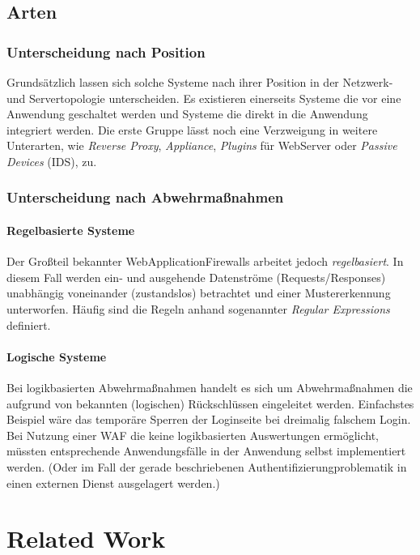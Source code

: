 \subsection{Arten}

\subsubsection{Unterscheidung nach Position}
Grundsätzlich lassen sich solche Systeme nach ihrer Position in der Netzwerk- und Servertopologie unterscheiden. Es existieren einerseits Systeme die vor eine Anwendung geschaltet werden und Systeme die direkt in die Anwendung integriert werden. Die erste Gruppe lässt noch eine Verzweigung in weitere Unterarten, wie \emph{Reverse Proxy}, \emph{Appliance}, \emph{Plugins} für WebServer oder \emph{Passive Devices} (IDS), zu.


\subsubsection{Unterscheidung nach Abwehrmaßnahmen}

\paragraph{Regelbasierte Systeme}
Der Großteil bekannter WebApplicationFirewalls arbeitet jedoch \emph{regelbasiert}. In diesem Fall werden ein- und ausgehende Datenströme (Requests/Responses) unabhängig voneinander (zustandslos) betrachtet und einer Mustererkennung unterworfen. Häufig sind die Regeln anhand sogenannter \emph{Regular Expressions} definiert.

\paragraph{Logische Systeme}
Bei logikbasierten Abwehrmaßnahmen handelt es sich um Abwehrmaßnahmen die aufgrund von bekannten (logischen) Rückschlüssen eingeleitet werden. Einfachstes Beispiel wäre das temporäre Sperren der Loginseite bei dreimalig falschem Login. Bei Nutzung einer WAF die keine logikbasierten Auswertungen ermöglicht, müssten entsprechende Anwendungsfälle in der Anwendung selbst implementiert werden. (Oder im Fall der gerade beschriebenen Authentifizierungproblematik in einen externen Dienst ausgelagert werden.)


\section{Related Work} %
\label{sec:relatedwork}


